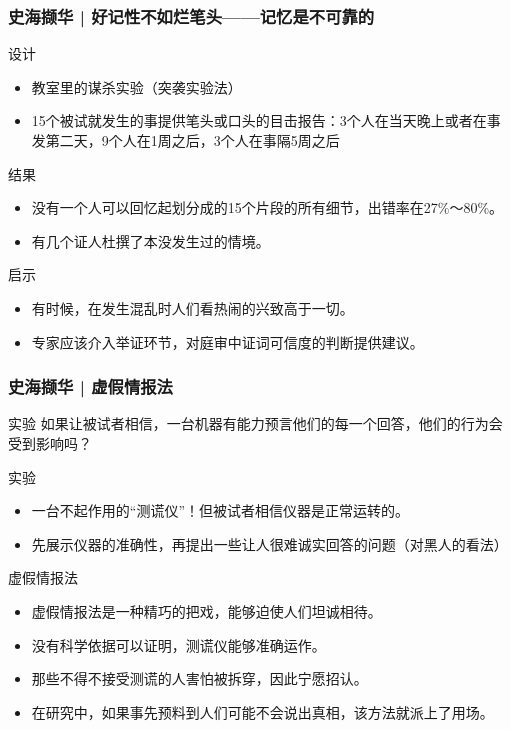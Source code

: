 \begin{frame}
  \frametitle{史海撷华 | 好记性不如烂笔头——记忆是不可靠的}
  \begin{block}{设计}
    \begin{itemize}
      \item 教室里的谋杀实验（突袭实验法）
      \item 15个被试就发生的事提供笔头或口头的目击报告：3个人在当天晚上或者在事发第二天，9个人在1周之后，3个人在事隔5周之后
    \end{itemize}
  \end{block}
  \pause
  \begin{block}{结果}
    \begin{itemize}
      \item 没有一个人可以回忆起划分成的15个片段的所有细节，出错率在27\%～80\%。
      \item 有几个证人杜撰了本没发生过的情境。
    \end{itemize}
  \end{block}
  \pause
  \begin{block}{启示}
    \begin{itemize}
      \item 有时候，在发生混乱时人们看热闹的兴致高于一切。
      \item 专家应该介入举证环节，对庭审中证词可信度的判断提供建议。
    \end{itemize}
  \end{block}
\end{frame}

\begin{frame}
  \frametitle{史海撷华 | 虚假情报法}
  \begin{block}{实验}
    如果让被试者相信，一台机器有能力预言他们的每一个回答，他们的行为会受到影响吗？
  \end{block}
  \vspace{-0.5em}
  \pause
  \begin{block}{实验}
    \begin{itemize}
      \item 一台不起作用的“测谎仪”！但被试者相信仪器是正常运转的。
      \item 先展示仪器的准确性，再提出一些让人很难诚实回答的问题（对黑人的看法）
    \end{itemize}
  \end{block}
  \vspace{-0.5em}
  \pause
  \begin{block}{虚假情报法}
    \begin{itemize}
      \item 虚假情报法是一种精巧的把戏，能够迫使人们坦诚相待。
      \item 没有科学依据可以证明，测谎仪能够准确运作。
      \item 那些不得不接受测谎的人害怕被拆穿，因此宁愿招认。
      \item \alert{在研究中，如果事先预料到人们可能不会说出真相，该方法就派上了用场。}
    \end{itemize}
  \end{block}
\end{frame}

